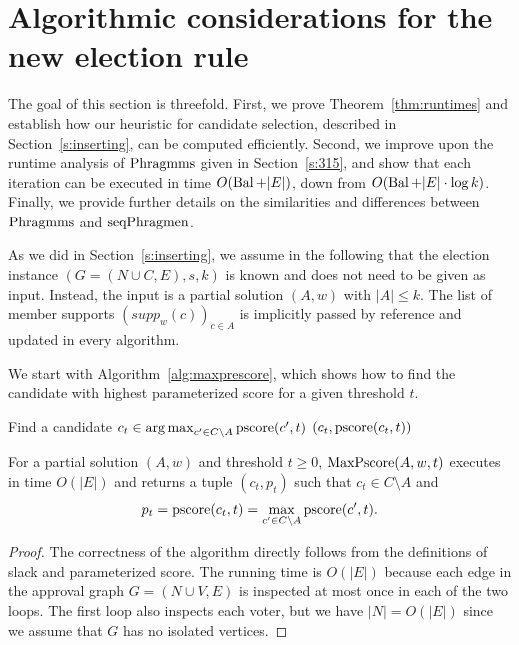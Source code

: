 \section{Algorithmic considerations for the new election rule}\label{s:algorithms}

The goal of this section is threefold. 
First, we prove Theorem~\ref{thm:runtimes} and establish how our heuristic for candidate selection, described in Section~\ref{s:inserting}, can be computed efficiently. 
Second, we improve upon the runtime analysis of $\operatorname{Phragmms}$ given in Section~\ref{s:315}, and show that each iteration can be executed in time $O(\operatorname{Bal} + |E|)$, down from $O(\operatorname{Bal} + |E|\cdot \log k)$. 
Finally, we provide further details on the similarities and differences between $\operatorname{Phragmms}$ and $\operatorname{seqPhragmen}$. 


As we did in Section~\ref{s:inserting}, we assume in the following that the election instance $(G=(N\cup C, E), s, k)$ is known and does not need to be given as input. Instead, the input is a partial solution $(A,w)$ with $|A|\leq k$. The list of member supports $(supp_w(c))_{c\in A}$ is implicitly passed by reference and updated in every algorithm.

We start with Algorithm~\ref{alg:maxprescore}, which shows how to find the candidate with highest parameterized score for a given threshold $t$.

\begin{algorithm}[htb]
\SetAlgoLined
{}
Find a candidate $c_t\in\operatorname*{arg\,max}_{c'\in C\setminus A} \operatorname{pscore}(c', t)$\;
\Return $(c_t, \operatorname{pscore}(c_t, t))$\;
 \caption{$\maxprescore(A,w,t)$}
\label{alg:maxprescore}
\end{algorithm}

\begin{lemma}
For a partial solution $(A,w)$ and threshold $t\geq 0$, $\maxprescore(A,w,t)$ executes in time $O(|E|)$ 
and returns a tuple $(c_t,p_t)$ such that $c_t\in C\setminus A$ 
and 
$$p_t=\operatorname{pscore}(c_t,t)=\max_{c'\in C\setminus A} \operatorname{pscore}(c',t).$$
\end{lemma}

\begin{proof}
The correctness of the algorithm directly follows from the definitions of slack and parameterized score. The running time is $O(|E|)$ because each edge in the approval graph $G=(N\cup V, E)$ is inspected at most once in each of the two loops. The first loop also inspects each voter, but we have $|N|=O(|E|)$ since we assume that $G$ has no isolated vertices.
\end{proof}

